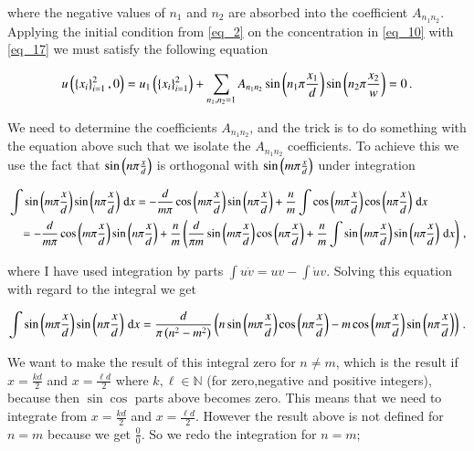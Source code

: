 \documentclass[11pt,english,a4paper]{article}
\begin{document}
\begin{flushleft}
where the negative values of $n_1$ and $n_2$ are absorbed into the coefficient $A_{n_1 n_2}$. Applying the initial condition from \eqref{eq_2} on the concentration in \eqref{eq_10} with \eqref{eq_17} we must satisfy the following equation

\begin{align}
u\left({\left\lbrace{x_i}\right\rbrace_{i=1}^2,0}\right) = u_1\left({\left\lbrace{x_i}\right\rbrace_{i=1}^2}\right)+ \sum_{n_1,n_2=1} A_{n_1 n_2} \sin\left({n_1\pi \frac{x_1}{d}}\right) \sin\left({n_2\pi \frac{x_2}{w}}\right)= 0 \,.
\label{eq_18}
\end{align}

We need to determine the coefficients $A_{n_1 n_2}$, and the trick is to do something with the equation above such that we isolate the $A_{n_1 n_2}$ coefficients. To achieve this we use the fact that $\sin\left({n\pi\frac{x}{d}}\right)$ is orthogonal with $\sin\left({m\pi\frac{x}{d}}\right)$ under integration 

\begin{align*}
&\int \sin\left({m\pi\frac{x}{d}}\right)\sin\left({n\pi\frac{x}{d}}\right)\,\mathrm{d}x = -\frac{d}{m\pi}\cos\left({m\pi\frac{x}{d}}\right)\sin\left({n\pi\frac{x}{d}}\right) + \frac{n}{m}\int \cos\left({m\pi\frac{x}{d}}\right)\cos\left({n\pi\frac{x}{d}}\right)\,\mathrm{d}x
\\
&\quad = -\frac{d}{m\pi}\cos\left({m\pi\frac{x}{d}}\right)\sin\left({n\pi\frac{x}{d}}\right) + \frac{n}{m}\left({\frac{d}{\pi m} \sin\left({m\pi\frac{x}{d}}\right) \cos\left({n\pi\frac{x}{d}}\right) + \frac{n}{m}\int \sin\left({m\pi\frac{x}{d}}\right)\sin\left({n\pi\frac{x}{d}}\right)\,\mathrm{d}x}\right) \,,
\end{align*}

where I have used integration by parts $\int u\dot{v} = uv - \int \dot{u}v$. Solving this equation with regard to the integral we get

\begin{align*}
\int \sin\left({m\pi\frac{x}{d}}\right)\sin\left({n\pi\frac{x}{d}}\right)\,\mathrm{d}x = \frac{d}{\pi\left({n^2 - m^2}\right)} \left({n \sin\left({m\pi\frac{x}{d}}\right)\cos\left({n\pi\frac{x}{d}}\right) - m \cos\left({m\pi\frac{x}{d}}\right)\sin\left({n\pi\frac{x}{d}}\right)}\right) \,.
\end{align*}

We want to make the result of this integral zero for $n\neq m$, which is the result if $x=\frac{k d}{2}$ and $x=\frac{\ell d}{2}$ where $k,\ell\in\mathbb{N}$ (for zero,negative and positive integers), because then $\sin\cos$ parts above becomes zero. This means that we need to integrate from $x=\frac{k d}{2}$ and $x=\frac{\ell d}{2}$. However the result above is not defined for $n=m$ because we get $\frac{0}{0}$. So we redo the integration for $n=m$;


\end{flushleft}
\end{document}
